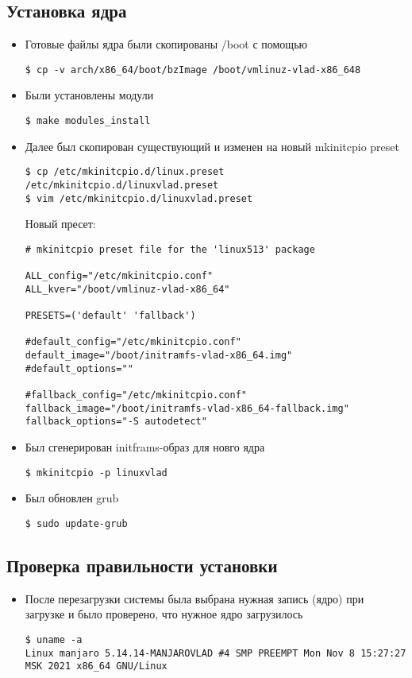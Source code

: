 \documentclass[a4paper]{article}
\begin{document}
    \subsection{Установка ядра}
    \begin{itemize}
        \item Готовые файлы ядра были скопированы /boot с помощью
        \begin{verbatim}
$ cp -v arch/x86_64/boot/bzImage /boot/vmlinuz-vlad-x86_648
        \end{verbatim}
        \item Были установлены модули
        \begin{verbatim}
$ make modules_install
        \end{verbatim}
        \item Далее был скопирован существующий и изменен на новый mkinitcpio preset
        \begin{verbatim}
$ cp /etc/mkinitcpio.d/linux.preset /etc/mkinitcpio.d/linuxvlad.preset
$ vim /etc/mkinitcpio.d/linuxvlad.preset
        \end{verbatim}
        Новый пресет:
        \begin{verbatim}
# mkinitcpio preset file for the 'linux513' package

ALL_config="/etc/mkinitcpio.conf"
ALL_kver="/boot/vmlinuz-vlad-x86_64"

PRESETS=('default' 'fallback')

#default_config="/etc/mkinitcpio.conf"
default_image="/boot/initramfs-vlad-x86_64.img"
#default_options=""

#fallback_config="/etc/mkinitcpio.conf"
fallback_image="/boot/initramfs-vlad-x86_64-fallback.img"
fallback_options="-S autodetect"
        \end{verbatim}
        \item Был сгенерирован initframs-образ для новго ядра
        \begin{verbatim}
$ mkinitcpio -p linuxvlad
        \end{verbatim}
        \item Был обновлен grub
        \begin{verbatim}
$ sudo update-grub
        \end{verbatim}
    \end{itemize}

    \subsection{Проверка правильности установки}
    \begin{itemize}
        \item После перезагрузки системы была выбрана нужная запись (ядро) при загрузке и было проверено,
        что нужное ядро загрузилось
        \begin{verbatim}
$ uname -a
Linux manjaro 5.14.14-MANJAROVLAD #4 SMP PREEMPT Mon Nov 8 15:27:27
MSK 2021 x86_64 GNU/Linux
        \end{verbatim}
    \end{itemize}
\end{document}
